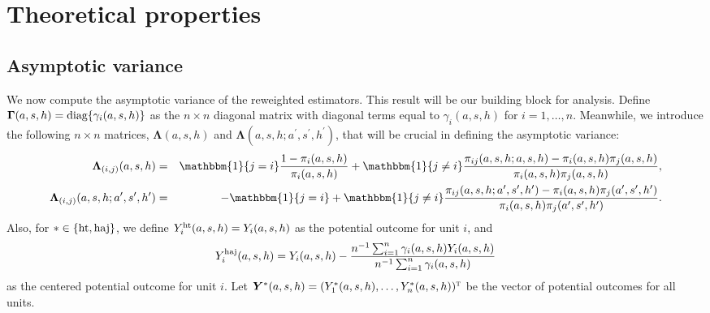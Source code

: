\documentclass{article}
\def\T{{\textsc{t}}}
\newcommand{\bY}{\boldsymbol{Y}}
\newcommand{\bLambda}{\boldsymbol{\Lambda}}
\newcommand{\bGamma}{\boldsymbol{\Gamma}}
\newcommand{\sumi}{\sum_{i=1}^n}
\newcommand{\horthom}{\textup{ht}}
\newcommand{\haj}{\textup{haj}}
\newcommand{\diag}{\textup{diag}}
\newcommand{\indicator}{\mathbbm{1}}
\newcommand{\ashprime}{a^{\prime},s^{\prime},h^{\prime}}
\newcommand{\pscore}[1]{\pi_{#1}}
\begin{document}
\section{Theoretical properties}

\subsection{Asymptotic variance}
We now compute the asymptotic variance of the reweighted estimators. This result will be our building block for analysis. Define $\bGamma(a,s,h)=\diag\{\gamma_i(a,s,h)\}$ as the $n\times n$ diagonal matrix with diagonal terms equal to $\gamma_i(a,s,h)$ for $i=1,\ldots,n$. Meanwhile, we introduce the following $n\times n$ matrices, $\bLambda(a,s,h)$ and $\bLambda(a,s,h;\ashprime)$, that will be crucial in defining the asymptotic variance: 
\begin{eqnarray*}
    \bLambda_{(i,j)}(a,s,h) &=& \indicator\{j=i\} \frac{1 - \pscore{i}(a, s, h)}{\pscore{i}(a, s, h)} + \indicator\{j\neq i\}\frac{\pscore{ij}(a, s, h; a, s, h) - \pscore{i}(a, s, h)\pscore{j}(a, s, h)}{\pscore{i}(a, s, h)\pscore{j}(a, s, h)}, \\
    \bLambda_{(i,j)}(a,s,h;\ashprime) &=& -\indicator\{j=i\}+ \indicator\{j\neq i\}\frac{\pscore{ij}(a, s, h; \ashprime) - \pscore{i}(a, s, h)\pscore{j}(\ashprime)}{\pscore{i}(a, s, h)\pscore{j}(\ashprime)}.
\end{eqnarray*}
Also, for $*\in\{\horthom,\haj\}$, we define $Y_i^{\horthom}(a,s,h)=Y_i(a,s,h)$ as the potential outcome for unit $i$, and
\begin{eqnarray*}
    Y_i^{\haj}(a,s,h) = 
    Y_i(a,s,h) - \frac{n^{-1}\sumi \gamma_i(a,s,h)Y_i(a,s,h)}{n^{-1}\sumi\gamma_i(a,s,h)}
\end{eqnarray*}
as the centered potential outcome for unit $i$. Let $\bY^{*}(a,s,h)=(Y_1^{*}(a,s,h),\ldots,Y_n^{*}(a,s,h))^{\T}$ be the vector of potential outcomes for all units. 
\end{document}
